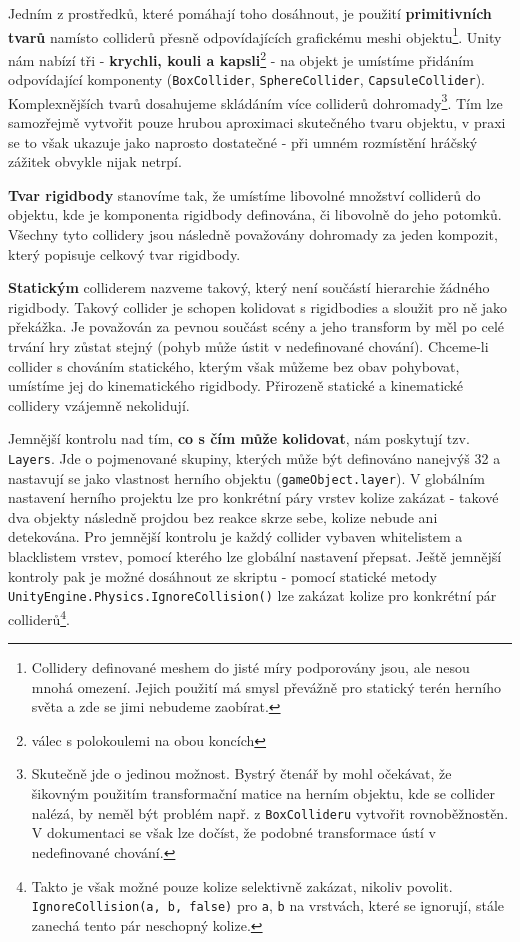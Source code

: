Jedním z prostředků, které pomáhají toho dosáhnout, je použití \textbf{primitivních tvarů} namísto colliderů přesně odpovídajících grafickému meshi objektu\footnote{Collidery definované meshem do jisté míry podporovány jsou, ale nesou mnohá omezení. Jejich použití má smysl převážně pro statický terén herního světa a zde se jimi nebudeme zaobírat.}. Unity nám nabízí tři - \textbf{krychli, kouli a kapsli}\footnote{válec s polokoulemi na obou koncích} - na objekt je umístíme přidáním odpovídající komponenty (\texttt{BoxCollider}, \texttt{SphereCollider}, \texttt{CapsuleCollider}). Komplexnějších tvarů dosahujeme skládáním více colliderů dohromady\footnote{Skutečně jde o jedinou možnost. Bystrý čtenář by mohl očekávat, že šikovným použitím transformační matice na herním objektu, kde se collider nalézá, by neměl být problém např. z \texttt{BoxCollideru} vytvořit rovnoběžnostěn. V dokumentaci se však lze dočíst, že podobné transformace ústí v nedefinované chování.}. Tím lze samozřejmě vytvořit pouze hrubou aproximaci skutečného tvaru objektu, v praxi se to však ukazuje jako naprosto dostatečné - při umném rozmístění hráčský zážitek obvykle nijak netrpí.

\textbf{Tvar rigidbody} stanovíme tak, že umístíme libovolné množství colliderů do objektu, kde je komponenta rigidbody definována, či libovolně do jeho potomků. Všechny tyto collidery jsou následně považovány dohromady za jeden kompozit, který popisuje celkový tvar rigidbody. 

\textbf{Statickým} colliderem nazveme takový, který není součástí hierarchie žádného rigidbody. Takový collider je schopen kolidovat s rigidbodies a sloužit pro ně jako překážka. Je považován za pevnou součást scény a jeho transform by měl po celé trvání hry zůstat stejný (pohyb může ústit v nedefinované chování). Chceme-li collider s chováním statického, kterým však můžeme bez obav pohybovat, umístíme jej do kinematického rigidbody. Přirozeně statické a kinematické collidery vzájemně nekolidují.

Jemnější kontrolu nad tím, \textbf{co s čím může kolidovat}, nám poskytují tzv. \texttt{Layers}. Jde o pojmenované skupiny, kterých může být definováno nanejvýš 32 a nastavují se jako vlastnost herního objektu (\texttt{gameObject.layer}). V globálním nastavení herního projektu lze pro konkrétní páry vrstev kolize zakázat - takové dva objekty následně projdou bez reakce skrze sebe, kolize nebude ani detekována. Pro jemnější kontrolu je každý collider vybaven whitelistem a blacklistem vrstev, pomocí kterého lze globální nastavení přepsat. Ještě jemnější kontroly pak je možné dosáhnout ze skriptu - pomocí statické metody \texttt{UnityEngine.Physics.IgnoreCollision()} lze zakázat kolize pro konkrétní pár colliderů\footnote{Takto je však možné pouze kolize selektivně zakázat, nikoliv povolit. \texttt{IgnoreCollision(a, b, false)} pro \texttt{a}, \texttt{b} na vrstvách, které se ignorují, stále zanechá tento pár neschopný kolize.}.

